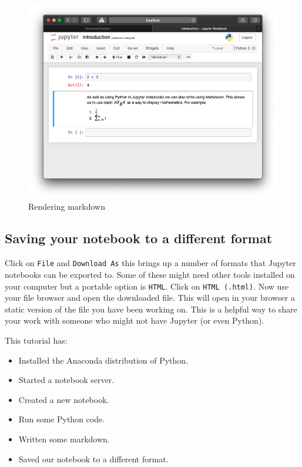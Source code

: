 \begin{figure}[htbp]
\centering
    \includegraphics[width=0.750\linewidth]{assets/rendering_markdown/main.png}
    \caption{Rendering markdown}\label{fig:rendering_markdown}
\end{figure}

\subsection{Saving your notebook to a different format}

Click on \texttt{File} and \texttt{Download As} this brings up a number of formats that
Jupyter notebooks can be exported to. Some of these might need other tools
installed on your computer but a portable option is \texttt{HTML}.
Click on \texttt{HTML (.html)}.
Now use your file browser and open the downloaded file. This will open in your
browser a static version of the file you have been working on. This is a helpful
way to share your work with someone who might not have Jupyter (or even Python).

This tutorial has:
\begin{itemize}
\item 

Installed the Anaconda distribution of Python.

\item 

Started a notebook server.

\item 

Created a new notebook.

\item 

Run some Python code.

\item 

Written some markdown.

\item 

Saved our notebook to a different format.

\end{itemize}




